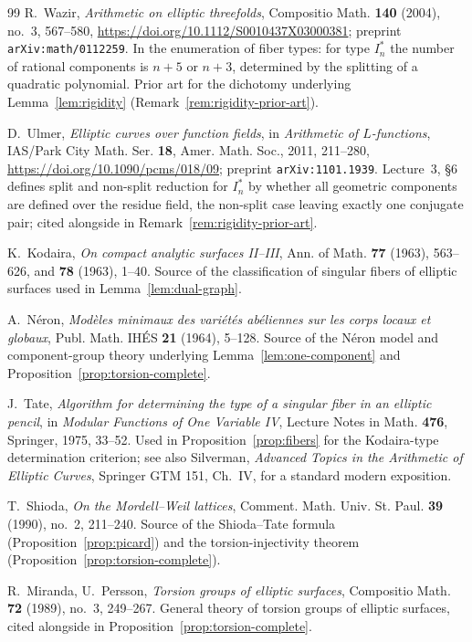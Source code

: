 \documentclass[11pt]{amsart}
\theoremstyle{definition}
\begin{document}
\begin{thebibliography}{99}
R.~Wazir, \emph{Arithmetic on elliptic threefolds}, Compositio Math.
\textbf{140} (2004), no.~3, 567--580,
\url{https://doi.org/10.1112/S0010437X03000381}; preprint
\texttt{arXiv:math/0112259}. In the enumeration of fiber types: for type
$I_n^*$ the number of rational components is $n+5$ or $n+3$, determined by
the splitting of a quadratic polynomial. Prior art for the dichotomy
underlying Lemma~\ref{lem:rigidity} (Remark~\ref{rem:rigidity-prior-art}).

D.~Ulmer, \emph{Elliptic curves over function fields}, in \emph{Arithmetic
of $L$-functions}, IAS/Park City Math. Ser. \textbf{18}, Amer. Math. Soc.,
2011, 211--280, \url{https://doi.org/10.1090/pcms/018/09}; preprint
\texttt{arXiv:1101.1939}. Lecture~3, \S6 defines split and non-split
reduction for $I_n^*$ by whether all geometric components are defined over
the residue field, the non-split case leaving exactly one conjugate pair;
cited alongside \cite{Wazir2004} in Remark~\ref{rem:rigidity-prior-art}.

K.~Kodaira, \emph{On compact analytic surfaces II--III}, Ann. of Math.
\textbf{77} (1963), 563--626, and \textbf{78} (1963), 1--40. Source of
the classification of singular fibers of elliptic surfaces used in
Lemma~\ref{lem:dual-graph}.

A.~N\'eron, \emph{Mod\`eles minimaux des vari\'et\'es ab\'eliennes sur les
corps locaux et globaux}, Publ. Math. IH\'ES \textbf{21} (1964), 5--128.
Source of the N\'eron model and component-group theory underlying
Lemma~\ref{lem:one-component} and Proposition~\ref{prop:torsion-complete}.

J.~Tate, \emph{Algorithm for determining the type of a singular fiber in
an elliptic pencil}, in \emph{Modular Functions of One Variable IV},
Lecture Notes in Math. \textbf{476}, Springer, 1975, 33--52. Used in
Proposition~\ref{prop:fibers} for the Kodaira-type determination
criterion; see also Silverman, \emph{Advanced Topics in the Arithmetic
of Elliptic Curves}, Springer GTM 151, Ch.~IV, for a standard modern
exposition.

T.~Shioda, \emph{On the Mordell--Weil lattices}, Comment. Math. Univ. St.
Paul. \textbf{39} (1990), no.~2, 211--240. Source of the Shioda--Tate
formula (Proposition~\ref{prop:picard}) and the torsion-injectivity
theorem (Proposition~\ref{prop:torsion-complete}).

R.~Miranda, U.~Persson, \emph{Torsion groups of elliptic surfaces},
Compositio Math. \textbf{72} (1989), no.~3, 249--267. General theory of
torsion groups of elliptic surfaces, cited alongside \cite{Shioda1990}
in Proposition~\ref{prop:torsion-complete}.


\end{thebibliography}
\end{document}
